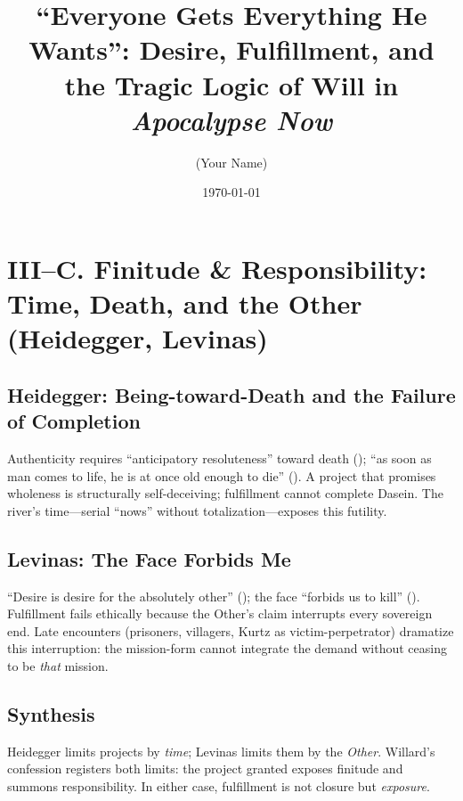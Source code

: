 \documentclass[12pt]{article}
\title{“Everyone Gets Everything He Wants”: Desire, Fulfillment, and the Tragic Logic of Will in \textit{Apocalypse Now}}
\author{(Your Name)}
\date{\today}
\begin{document}
\maketitle

\section*{III–C. Finitude \& Responsibility: Time, Death, and the Other (Heidegger, Levinas)}

\subsection*{Heidegger: Being-toward-Death and the Failure of Completion}
Authenticity requires “anticipatory resoluteness” toward death (\parencite[p.~307]{HeideggerBT1962}); “as soon as man comes to life, he is at once old enough to die” (\parencite[p.~298]{HeideggerBT1962}). A project that promises wholeness is structurally self-deceiving; fulfillment cannot complete Dasein. The river’s time—serial “nows” without totalization—exposes this futility.

\subsection*{Levinas: The Face Forbids Me}
“Desire is desire for the absolutely other” (\parencite[p.~33]{LevinasTI1969}); the face “forbids us to kill” (\parencite[p.~199]{LevinasTI1969}). Fulfillment fails ethically because the Other’s claim interrupts every sovereign end. Late encounters (prisoners, villagers, Kurtz as victim-perpetrator) dramatize this interruption: the mission-form cannot integrate the demand without ceasing to be \emph{that} mission.

\subsection*{Synthesis}
Heidegger limits projects by \emph{time}; Levinas limits them by the \emph{Other}. Willard’s confession registers both limits: the project granted exposes finitude and summons responsibility. In either case, fulfillment is not closure but \emph{exposure}.

\printbibliography
\end{document}
